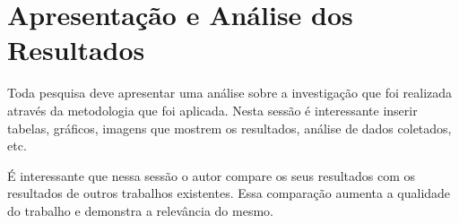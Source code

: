 \chapter{Apresentação e Análise dos Resultados}

Toda pesquisa deve apresentar uma análise sobre a investigação que foi
realizada através da metodologia que foi aplicada. Nesta sessão é interessante
inserir tabelas, gráficos, imagens que mostrem os resultados, análise de dados
coletados, etc.

É interessante que nessa sessão o autor compare os seus resultados com os
resultados de outros trabalhos existentes. Essa comparação aumenta a qualidade
do trabalho e demonstra a relevância do mesmo. 

